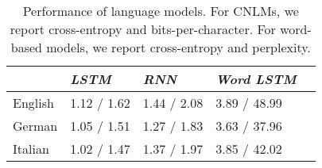 \begin{table}[t]
  \begin{center}
    \begin{tabular}{l|l|l|l|l}
      \multicolumn{1}{c}{}&\emph{LSTM}&\emph{RNN}&\emph{Word LSTM}\\
      \hline
	    English & 1.12 / 1.62 & 1.44 / 2.08 & 3.89 / 48.99  \\
	    German &  1.05 / 1.51 & 1.27 / 1.83 & 3.63 / 37.96   \\
	    Italian & 1.02 / 1.47 & 1.37 / 1.97 & 3.85 / 42.02  \\
    \end{tabular}
  \end{center}
  \caption{\label{tab:lm-results} Performance of language models. For CNLMs, we report cross-entropy and bits-per-character. For word-based models, we report cross-entropy and perplexity.}
\end{table}




